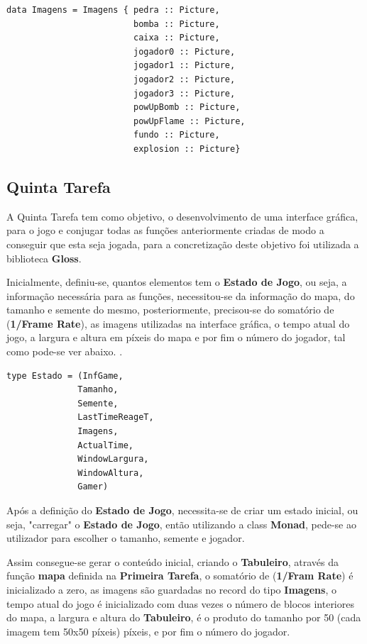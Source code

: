 \documentclass[4apaper]{report}
\begin{document}
\begin{verbatim}
data Imagens = Imagens { pedra :: Picture,
                         bomba :: Picture, 
                         caixa :: Picture, 
                         jogador0 :: Picture, 
                         jogador1 :: Picture, 
                         jogador2 :: Picture, 
                         jogador3 :: Picture, 
                         powUpBomb :: Picture, 
                         powUpFlame :: Picture, 
                         fundo :: Picture, 
                         explosion :: Picture}
\end{verbatim} 

\subsection{Quinta Tarefa}

A Quinta Tarefa tem como objetivo, o desenvolvimento de uma interface gráfica, para o jogo e conjugar todas as funções anteriormente criadas de modo a conseguir que esta seja jogada, para a concretização deste objetivo foi utilizada a biblioteca \textbf{Gloss}.

Inicialmente, definiu-se, quantos elementos tem o \textbf{Estado de Jogo}, ou seja, a informação necessária para as funções, necessitou-se da informação do mapa, do tamanho e semente do mesmo, posteriormente, precisou-se do somatório de (\textbf{1/Frame Rate}), as imagens utilizadas na interface gráfica, o tempo atual do jogo, a largura e altura em píxeis do mapa e por fim o número do jogador, tal como pode-se ver abaixo.
.
\begin{verbatim}
type Estado = (InfGame,
			  Tamanho,
			  Semente,
			  LastTimeReageT,
			  Imagens,
			  ActualTime,
			  WindowLargura,
			  WindowAltura,
			  Gamer)
\end{verbatim}  

Após a definição do \textbf{Estado de Jogo}, necessita-se de criar um estado inicial, ou seja, "carregar" o \textbf{Estado de Jogo}, então utilizando a class \textbf{Monad}, pede-se ao utilizador para escolher o tamanho, semente e jogador. 

Assim consegue-se gerar o conteúdo inicial, criando o \textbf{Tabuleiro}, através da função \textbf{mapa} definida na \textbf{Primeira Tarefa}, o somatório de (\textbf{1/Fram Rate}) é inicializado a zero, as imagens são guardadas no record do tipo \textbf{Imagens}, o tempo atual do jogo é inicializado com duas vezes o número de blocos interiores do mapa, a largura e altura do \textbf{Tabuleiro}, é o produto do tamanho por 50 (cada imagem tem 50x50 píxeis) píxeis, e por fim o número do jogador.
\end{document}
